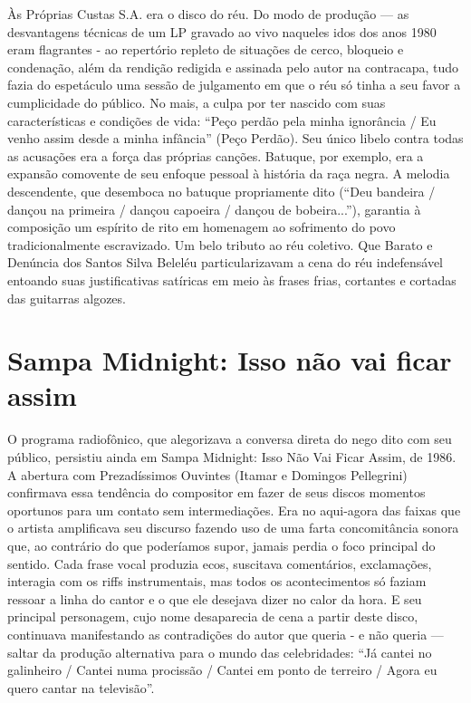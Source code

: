Às Próprias Custas S.A. era o disco do réu. Do modo de produção --- as
desvantagens técnicas de um LP gravado ao vivo naqueles idos dos anos
1980 eram flagrantes - ao repertório repleto de situações de cerco,
bloqueio e condenação, além da rendição redigida e assinada pelo autor
na contracapa, tudo fazia do espetáculo uma sessão de julgamento em que
o réu só tinha a seu favor a cumplicidade do público. No mais, a culpa
por ter nascido com suas características e condições de vida: ``Peço
perdão pela minha ignorância / Eu venho assim desde a minha infância''
(Peço Perdão). Seu único libelo contra todas as acusações era a força
das próprias canções. Batuque, por exemplo, era a expansão comovente de
seu enfoque pessoal à história da raça negra. A melodia descendente, que
desemboca no batuque propriamente dito (``Deu bandeira / dançou na
primeira / dançou capoeira / dançou de bobeira...''), garantia à
composição um espírito de rito em homenagem ao sofrimento do povo
tradicionalmente escravizado. Um belo tributo ao réu coletivo. Que
Barato e Denúncia dos Santos Silva Beleléu particularizavam a cena do
réu indefensável entoando suas justificativas satíricas em meio às
frases frias, cortantes e cortadas das guitarras algozes.

\section{Sampa Midnight: Isso não vai ficar assim}

O programa radiofônico, que alegorizava a conversa direta do nego dito
com seu público, persistiu ainda em Sampa Midnight: Isso Não Vai Ficar
Assim, de 1986. A abertura com Prezadíssimos Ouvintes (Itamar e Domingos
Pellegrini) confirmava essa tendência do compositor em fazer de seus
discos momentos oportunos para um contato sem intermediações. Era no
aqui-agora das faixas que o artista amplificava seu discurso fazendo uso
de uma farta concomitância sonora que, ao contrário do que poderíamos
supor, jamais perdia o foco principal do sentido. Cada frase vocal
produzia ecos, suscitava comentários, exclamações, interagia com os
riffs instrumentais, mas todos os acontecimentos só faziam ressoar a
linha do cantor e o que ele desejava dizer no calor da hora. E seu
principal personagem, cujo nome desaparecia de cena a partir deste
disco, continuava manifestando as contradições do autor que queria - e
não queria --- saltar da produção alternativa para o mundo das
celebridades: ``Já cantei no galinheiro / Cantei numa procissão / Cantei
em ponto de terreiro / Agora eu quero cantar na televisão''.

